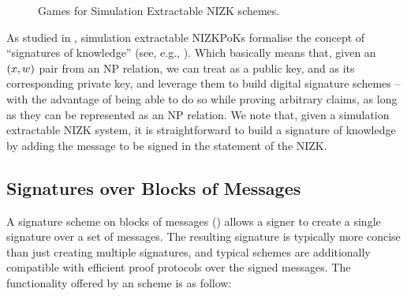 \begin{figure}[ht!]
{\begin{minipage}[t]{0.55\textwidth}
    \end{minipage}
  }
  \label{fig:nizk-games}
  \caption{Games for Simulation Extractable NIZK schemes.}
\end{figure}

As studied in \cite{cl06}, simulation extractable NIZKPoKs formalise the concept
of ``signatures of knowledge'' (see, e.g., \cite{cs97}). Which basically means
that, given an $(x,w)$ pair from an NP relation, we can treat \NIZKx
as a public key, and \NIZKw as its corresponding private key, and leverage them
to build digital signature schemes -- with the advantage of being able to do so
while proving arbitrary claims, as long as they can be represented as an NP
relation. We note that, given a simulation extractable NIZK system, it is
straightforward to build a signature of knowledge by adding the message to be
signed in the statement of the NIZK.

\iffalse
\subsection{Signatures over Blocks of Messages}
\label{sapp:sbm}

A signature scheme on blocks of messages (\SBM) allows a signer to create a
single signature over a set of messages. The resulting signature is typically
more concise than just creating multiple signatures, and typical schemes
\cite{cl02,asm06,ps16} are additionally compatible with efficient proof
protocols over the signed messages. The functionality offered by an \SBM scheme
is as follow:

